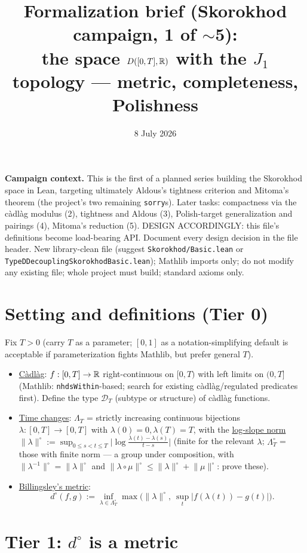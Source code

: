 \documentclass[11pt]{article}
\title{Formalization brief (Skorokhod campaign, 1 of $\sim$5):\\
the space $D([0,T],\mathbb{R})$ with the $J_1$ topology --- metric, completeness,
Polishness}
\date{8 July 2026}
\theoremstyle{plain}
\theoremstyle{remark}
\newcommand{\D}{\mathcal D}\newcommand{\norm}[1]{\lVert #1\rVert}
\begin{document}
\maketitle

\noindent\textbf{Campaign context.} This is the first of a planned series
building the Skorokhod space in Lean, targeting ultimately Aldous's tightness
criterion and Mitoma's theorem (the project's two remaining \texttt{sorry}s).
Later tasks: compactness via the c\`adl\`ag modulus (2), tightness and Aldous
(3), Polish-target generalization and pairings (4), Mitoma's reduction (5).
DESIGN ACCORDINGLY: this file's definitions become load-bearing API. Document
every design decision in the file header. New library-clean file (suggest
\texttt{Skorokhod/Basic.lean} or \texttt{TypeDDecouplingSkorokhodBasic.lean});
Mathlib imports only; do not modify any existing file; whole project must
build; standard axioms only.

\section*{Setting and definitions (Tier 0)}

Fix $T>0$ (carry $T$ as a parameter; $[0,1]$ as a notation-simplifying default
is acceptable if parameterization fights Mathlib, but prefer general $T$).
\begin{itemize}
\item \underline{C\`adl\`ag}: $f:[0,T]\to\mathbb{R}$ right-continuous on $[0,T)$ with
left limits on $(0,T]$ (Mathlib: \texttt{nhdsWithin}-based; search for existing
c\`adl\`ag/regulated predicates first). Define the type $\D_T$ (subtype or
structure) of c\`adl\`ag functions.
\item \underline{Time changes}: $\Lambda_T$ = strictly increasing continuous
bijections $\lambda:[0,T]\to[0,T]$ with $\lambda(0)=0,\lambda(T)=T$, with the
\underline{log-slope norm}
$\norm\lambda^\circ:=\sup_{0\le s<t\le T}
\big|\log\frac{\lambda(t)-\lambda(s)}{t-s}\big|$ (finite for the relevant
$\lambda$; $\Lambda^\circ_T$ = those with finite norm --- a group under
composition, with $\norm{\lambda^{-1}}^\circ=\norm\lambda^\circ$ and
$\norm{\lambda\circ\mu}^\circ\le\norm\lambda^\circ+\norm\mu^\circ$: prove
these).
\item \underline{Billingsley's metric}:
\[
  d^\circ(f,g):=\inf_{\lambda\in\Lambda^\circ_T}
  \max\big(\norm\lambda^\circ,\ \sup_{t}|f(\lambda(t))-g(t)|\big).
\]
\end{itemize}

\section*{Tier 1: $d^\circ$ is a metric}
\end{document}
